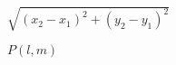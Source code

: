 \documentclass{article}
\begin{document}
$\sqrt{(x_2-x_1)^2+(y_2-y_1)^2}$
\pagebreak

$P(l, m)$
\pagebreak
\end{document}
